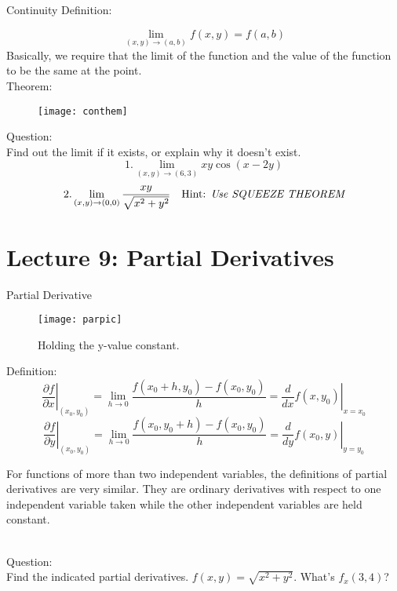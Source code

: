 \documentclass[10pt]{beamer}
\begin{document}
\begin{frame}[allowframebreaks]{Continuity}
Definition:

$$\lim_{(x,y)\rightarrow(a,b)} f(x,y)= f(a,b)$$
Basically, we require that {\color{red} the limit of the function
	and the value of the function to be the same at the point}.
\\Theorem:
\begin{figure}[H]
	\centering
	\texttt{[image: conthem]}
\end{figure}
{\color{purple}
	Question: 
	\\Find out the limit if it exists, or explain why it doesn't exist.
	$$1. \lim_{(x,y)\rightarrow(6,3)}xy\cos(x-2y)$$
	$$2. \lim_{(x,y)\rightarrow (0,0)}\dfrac{xy}{\sqrt{x^2 + y^2}} 	~~~\text{Hint: {\it Use SQUEEZE THEOREM}}$$

}

\end{frame}





\section{Lecture 9: Partial Derivatives} 



\begin{frame}[allowframebreaks]{Partial Derivative}
\begin{figure}[H]
	\centering
	\texttt{[image: parpic]}
	\caption{Holding the {\color{red}y-value} constant.}
\end{figure}
\noindent Definition:
$$\left.\dfrac{\partial f}{\partial x}\right\vert_{(x_0,y_0)} = \lim_{h\rightarrow 0}\dfrac{f(x_0 + h, y_0) - f(x_0, y_0)}{h} = \left.\dfrac{d}{dx}f(x,y_0)\right\vert_{x = x_0}$$
$$\left.\dfrac{\partial f}{\partial y}\right\vert_{(x_0,y_0)} = \lim_{h\rightarrow 0}\dfrac{f(x_0, y_0 + h) - f(x_0, y_0)}{h} =  \left.\dfrac{d}{dy}f(x_0,y)\right\vert_{y = y_0} $$
\newpage

For functions of more than two independent variables, the definitions of partial derivatives are very similar. They are ordinary derivatives with respect to {\color{red} one independent variable} taken while the other
independent variables are {\color{red}held constant}.
\\~\\
{\color{purple}
	Question: 
	\\Find the indicated partial derivatives. $f(x,y) = \sqrt{x^2 + y^2}$. What's $f_x(3,4)$?
	
}
\end{frame}
\end{document}
